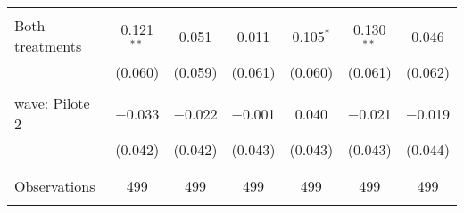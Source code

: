 \begin{tabular}{@{\extracolsep{5pt}}lcccccc}
  & & & & & & \\ 
 Both treatments & 0.121$^{**}$ & 0.051 & 0.011 & 0.105$^{*}$ & 0.130$^{**}$ & 0.046 \\ 
  & (0.060) & (0.059) & (0.061) & (0.060) & (0.061) & (0.062) \\ 
  & & & & & & \\ 
 wave: Pilote 2 & $-$0.033 & $-$0.022 & $-$0.001 & 0.040 & $-$0.021 & $-$0.019 \\ 
  & (0.042) & (0.042) & (0.043) & (0.043) & (0.043) & (0.044) \\ 
  & & & & & & \\ 
\hline \\[-1.8ex] 

Observations & 499 & 499 & 499 & 499 & 499 & 499 \\ 
\hline 
\hline \\[-1.8ex] 
\end{tabular} 